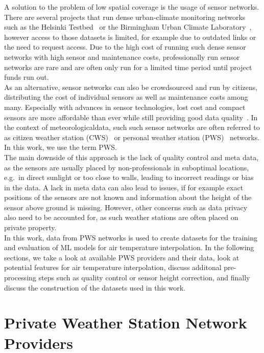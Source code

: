 A solution to the problem of low spatial coverage is the usage of sensor networks. There are several projects that run dense urban-climate monitoring networks~\cite{muller2013sensors} such as the Helsinki Testbed~\cite{koskinen2011helsinki} or the Birmingham Urban Climate Laboratory~\cite{warren2016birmingham}, however access to those datasets is limited, for example due to outdated links or the need to request access. Due to the high cost of running such dense sensor networks with high sensor and maintenance costs, professionally run sensor networks are rare and are often only run for a limited time period until project funds run out.\\
As an alternative, sensor networks can also be crowdsourced and run by citizens, distributing the cost of individual sensors as well as maintenance costs among many. Especially with advances in sensor technologies, lost cost and compact sensors are more affordable than ever while still providing good data quality~\cite{grimmond2006progress, rundel2009environmental}. In the context of meteorologicaldata, such such sensor networks are often referred to as citizen weather station (CWS)~\cite{meier2017crowdsourcing} or personal weather station (PWS)~\cite{hahn2022observations} networks. In this work, we use the term PWS.\\
The main downside of this approach is the lack of quality control and meta data, as the sensors are usually placed by non-professionals in suboptimal locations, e.g.\ in direct sunlight or too close to walls, leading to incorrect readings or bias in the data. A lack in meta data can also lead to issues, if for example exact positions of the sensors are not known and information about the height of the sensor above ground is missing. However, other concerns such as data privacy also need to be accounted for, as such weather stations are often placed on private property.\\
In this work, data from PWS networks is used to create datasets for the training and evaluation of ML models for air temperature interpolation. In the following sections, we take a look at available PWS providers and their data, look at potential features for air temperature interpolation, discuss additonal pre-processing steps such as quality control or sensor height correction, and finally discuss the construction of the datasets used in this work.

\section{Private Weather Station Network Providers}
\label{sec: private weather station network providers}

